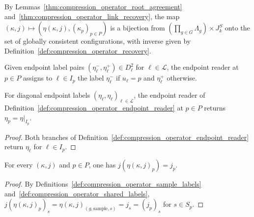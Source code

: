 \begin{definition}
    \label{def:compression_operator_configuration_bijection}
    \leanok
    By Lemmas~\ref{thm:compression_operator_root_agreement} and~\ref{thm:compression_operator_link_recovery}, the map $(\kappa,j)\mapsto(\eta(\kappa,j),(\kappa_p)_{p\in P})$ is a bijection from $(\prod_{g\in G}\Lambda_g)\times J_k^S$ onto the set of globally consistent configurations, with inverse given by Definition~\ref{def:compression_operator_recovery}.
\end{definition}

\begin{definition}
    \label{def:compression_operator_endpoint_reader}
    \leanok
    Given endpoint label pairs $(\eta_\ell^-,\eta_\ell^+)\in D_\ell^2$ for $\ell\in\mathcal L$, the endpoint reader at $p\in P$ assigns to $\ell\in I_p$ the label $\eta_\ell^-$ if $u_\ell=p$ and $\eta_\ell^+$ otherwise.
\end{definition}

\begin{lemma}
    \label{thm:compression_operator_diagonal_reader}
    \leanok
    For diagonal endpoint labels $(\eta_\ell,\eta_\ell)_{\ell\in\mathcal L}$, the endpoint reader of Definition~\ref{def:compression_operator_endpoint_reader} at $p\in P$ returns $\eta_p=\eta|_{I_p}$.
\end{lemma}

\begin{proof}\leanok
    Both branches of Definition~\ref{def:compression_operator_endpoint_reader} return $\eta_\ell$ for $\ell\in I_p$.
\end{proof}

\begin{lemma}
    \label{thm:compression_operator_shared_samples}
    \leanok
    For every $(\kappa,j)$ and $p\in P$, one has $j(\eta(\kappa,j)_p)=j_p$.
\end{lemma}

\begin{proof}\leanok
    By Definitions~\ref{def:compression_operator_sample_labels} and~\ref{def:compression_operator_shared_labels}, $j(\eta(\kappa,j)_p)_s=\eta(\kappa,j)_{(g,\mathrm{sample},s)}=j_s=(j_p)_s$ for $s\in S_p$.
\end{proof}


